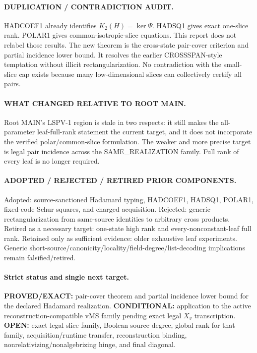 \documentclass[11pt]{article}
\begin{document}
\paragraph{DUPLICATION / CONTRADICTION AUDIT.}
HADCOEF1 already identifies \(K_2(H)=\ker\Psi\). HADSQ1 gives exact one-slice rank. POLAR1 gives common-isotropic-slice equations. This report does not relabel those results. The new theorem is the cross-state pair-cover criterion and partial incidence lower bound. It resolves the earlier CROSSSPAN-style temptation without illicit rectangularization. No contradiction with the small-slice cap exists because many low-dimensional slices can collectively certify all pairs.

\paragraph{WHAT CHANGED RELATIVE TO ROOT MAIN.}
Root MAIN's LSPV-1 region is stale in two respects: it still makes the all-parameter leaf-full-rank statement the current target, and it does not incorporate the verified polar/common-slice formulation. The weaker and more precise target is legal pair incidence across the SAME\_REALIZATION family. Full rank of every leaf is no longer required.

\paragraph{ADOPTED / REJECTED / RETIRED PRIOR COMPONENTS.}
Adopted: source-sanctioned Hadamard typing, HADCOEF1, HADSQ1, POLAR1, fixed-code Schur squares, and charged acquisition. Rejected: generic rectangularization from same-source identities to arbitrary cross products. Retired as a necessary target: one-state high rank and every-nonconstant-leaf full rank. Retained only as sufficient evidence: older exhaustive leaf experiments. Generic short-source/canonicity/locality/field-degree/list-decoding implications remain falsified/retired.

\paragraph{Strict status and single next target.}
\textbf{PROVED/EXACT:} pair-cover theorem and partial incidence lower bound for the declared Hadamard realization.
\textbf{CONDITIONAL:} application to the active reconstruction-compatible vMS family pending exact legal \(X_v\) transcription.
\textbf{OPEN:} exact legal slice family, Boolean source degree, global rank for that family, acquisition/runtime transfer, reconstruction binding, nonrelativizing/nonalgebrizing hinge, and final diagonal.
\end{document}
